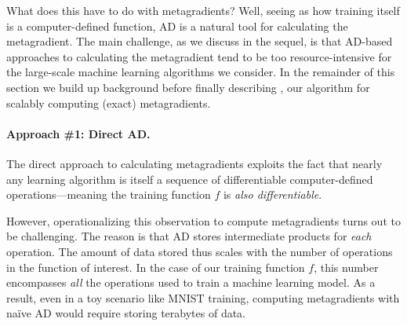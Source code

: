 What does this have to do with metagradients? 
Well, seeing as how training itself is a computer-defined function, 
AD is a natural tool for calculating the metagradient. The main challenge, 
as we discuss in the sequel, is that AD-based approaches to calculating 
the metagradient tend to be too resource-intensive for the large-scale machine
learning algorithms we consider.
In the remainder of this section we build up background before finally
describing \replay{}, our algorithm for scalably computing (exact)
metagradients.

\paragraph{Approach \#1: Direct AD.} The direct approach to calculating
metagradients exploits the fact that nearly any learning algorithm
is itself a sequence
of differentiable computer-defined operations---meaning the training function $f$
is \emph{also differentiable}.

However, operationalizing this observation to compute metagradients
turns out to be challenging.
The reason is that AD stores intermediate
products for {\em each} operation.
The amount of data stored thus scales with the number of operations 
in the function of interest. In the case of our training function $f$,
this number encompasses {\em all} the operations used to train a machine 
learning model.
As a result, even in a toy scenario like MNIST training, computing metagradients
with na\"ive AD would require storing terabytes of data. 

